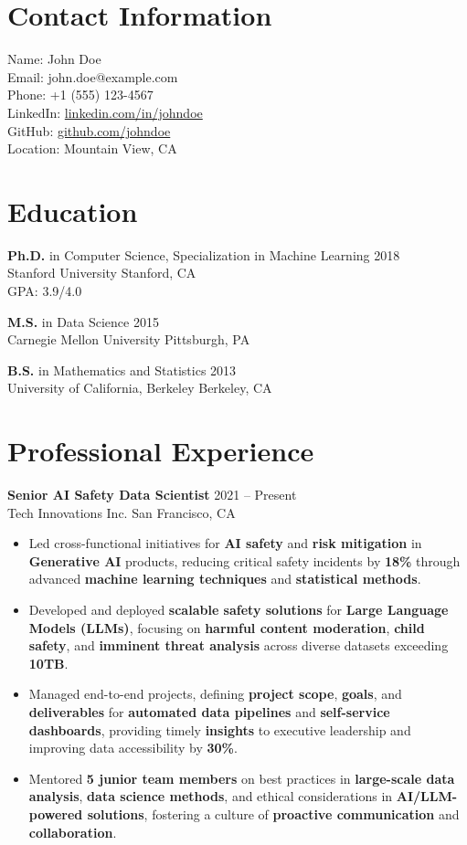 \documentclass[11pt,a4paper]{article}
\begin{document}
\section*{Contact Information}
Name: John Doe \\
Email: john.doe@example.com \\
Phone: +1 (555) 123-4567 \\
LinkedIn: \href{https://www.linkedin.com/in/johndoe}{linkedin.com/in/johndoe} \\
GitHub: \href{https://github.com/johndoe}{github.com/johndoe} \\
Location: Mountain View, CA

\section*{Education}
\textbf{Ph.D.} in Computer Science, Specialization in Machine Learning \hfill 2018 \\
Stanford University \hfill Stanford, CA \\
GPA: 3.9/4.0

\textbf{M.S.} in Data Science \hfill 2015 \\
Carnegie Mellon University \hfill Pittsburgh, PA

\textbf{B.S.} in Mathematics and Statistics \hfill 2013 \\
University of California, Berkeley \hfill Berkeley, CA

\section*{Professional Experience}
\textbf{Senior AI Safety Data Scientist} \hfill 2021 – Present \\
Tech Innovations Inc. \hfill San Francisco, CA
\begin{itemize}
    \item Led cross-functional initiatives for \textbf{AI safety} and \textbf{risk mitigation} in \textbf{Generative AI} products, reducing critical safety incidents by \textbf{18\%} through advanced \textbf{machine learning techniques} and \textbf{statistical methods}.
    \item Developed and deployed \textbf{scalable safety solutions} for \textbf{Large Language Models (LLMs)}, focusing on \textbf{harmful content moderation}, \textbf{child safety}, and \textbf{imminent threat analysis} across diverse datasets exceeding \textbf{10TB}.
    \item Managed end-to-end projects, defining \textbf{project scope}, \textbf{goals}, and \textbf{deliverables} for \textbf{automated data pipelines} and \textbf{self-service dashboards}, providing timely \textbf{insights} to executive leadership and improving data accessibility by \textbf{30\%}.
    \item Mentored \textbf{5 junior team members} on best practices in \textbf{large-scale data analysis}, \textbf{data science methods}, and ethical considerations in \textbf{AI/LLM-powered solutions}, fostering a culture of \textbf{proactive communication} and \textbf{collaboration}.
\end{itemize}
\end{document}
